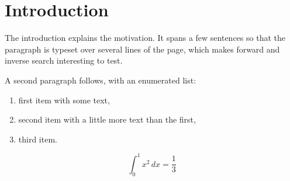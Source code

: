 \section{Introduction}
\label{sec:intro}
The introduction explains the motivation. It spans a few sentences
so that the paragraph is typeset over several lines of the page,
which makes forward and inverse search interesting to test.

A second paragraph follows, with an enumerated list:
\begin{enumerate}
  \item first item with some text,
  \item second item with a little more text than the first,
  \item third item.
\end{enumerate}

\begin{equation}
  \int_0^1 x^2 \, dx = \frac{1}{3}
  \label{eq:int}
\end{equation}
